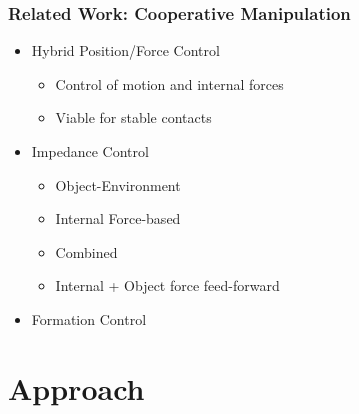 \documentclass[student]{ITRslides}
\begin{document}
\begin{frame}
	\frametitle{Related Work: Cooperative Manipulation}
	\begin{itemize}
		\item Hybrid Position/Force Control  \cite{Hsu_93}
		\begin{itemize}
			\item Control of motion and internal forces
			\item Viable for stable contacts
		\end{itemize}
		\item Impedance Control
		\begin{itemize}
			\item Object-Environment \cite{Schneider_92}
			\item Internal Force-based\cite{Bonitz_96}
			\item Combined \cite{Caccavale_01,Caccavale_08}
			\item Internal + Object force feed-forward \cite{DePascali_15}
		\end{itemize}
		\item Formation Control \cite{Sieber_15}
	\end{itemize}
\end{frame}

\section{Approach}
\end{document}
